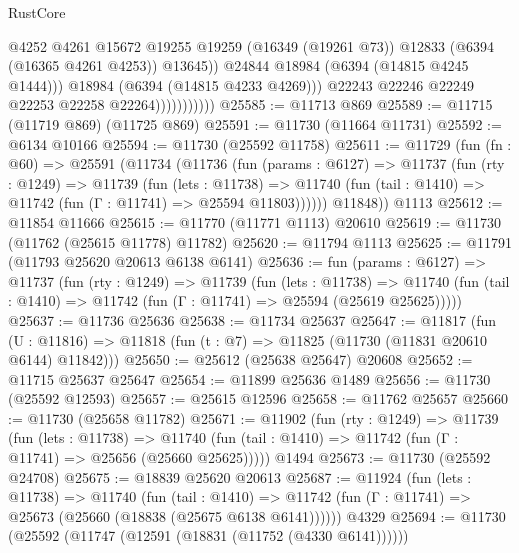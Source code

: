 \begin{lexlean}{RustCore}
\begin{coremodule}
                                  @4252
                                  @4261
                                  @15672
                                  @19255
                                  @19259
                                  (@16349 (@19261 @73))
                                  @12833
                                  (@6394 (@16365 @4261 @4253))
                                  @13645))
                              @24844
                              @18984
                              (@6394 (@14815 @4245 @1444)))
                            @18984
                            (@6394 (@14815 @4233 @4269)))
                          @22243
                          @22246
                          @22249
                          @22253
                          @22258
                          @22264)))))))))))
@25585 := @11713 @869
@25589 := @11715 (@11719 @869) (@11725 @869)
@25591 := @11730 (@11664 @11731)
@25592 := @6134 @10166
@25594 := @11730 (@25592 @11758)
@25611 := @11729
    (fun (fn : @60) =>
    @25591
      (@11734
        (@11736
          (fun (params : @6127) =>
          @11737
            (fun (rty : @1249) =>
            @11739
              (fun (lets : @11738) =>
              @11740 (fun (tail : @1410) => @11742 (fun (Γ : @11741) => @25594 @11803))))))
        @11848))
    @1113
@25612 := @11854 @11666
@25615 := @11770 (@11771 @1113) @20610
@25619 := @11730 (@11762 (@25615 @11778) @11782)
@25620 := @11794 @1113
@25625 := @11791 (@11793 @25620 @20613 @6138 @6141)
@25636 := fun (params : @6127) =>
  @11737
    (fun (rty : @1249) =>
    @11739
      (fun (lets : @11738) =>
      @11740 (fun (tail : @1410) => @11742 (fun (Γ : @11741) => @25594 (@25619 @25625)))))
@25637 := @11736 @25636
@25638 := @11734 @25637
@25647 := @11817
    (fun (U : @11816) => @11818 (fun (t : @7) => @11825 (@11730 (@11831 @20610 @6144) @11842)))
@25650 := @25612 (@25638 @25647) @20608
@25652 := @11715 @25637 @25647
@25654 := @11899 @25636 @1489
@25656 := @11730 (@25592 @12593)
@25657 := @25615 @12596
@25658 := @11762 @25657
@25660 := @11730 (@25658 @11782)
@25671 := @11902
    (fun (rty : @1249) =>
    @11739
      (fun (lets : @11738) =>
      @11740 (fun (tail : @1410) => @11742 (fun (Γ : @11741) => @25656 (@25660 @25625)))))
    @1494
@25673 := @11730 (@25592 @24708)
@25675 := @18839 @25620 @20613
@25687 := @11924
    (fun (lets : @11738) =>
    @11740
      (fun (tail : @1410) =>
      @11742 (fun (Γ : @11741) => @25673 (@25660 (@18838 (@25675 @6138 @6141))))))
    @4329
@25694 := @11730 (@25592 (@11747 (@12591 (@18831 (@11752 (@4330 @6141))))))

\end{coremodule}
\end{lexlean}
